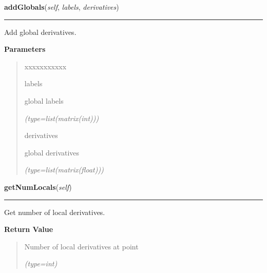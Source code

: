 \hspace{.8\funcindent}\begin{boxedminipage}{\funcwidth}

    \raggedright \textbf{addGlobals}(\textit{self}, \textit{labels}, \textit{derivatives})

    \vspace{-1.5ex}

    \rule{\textwidth}{0.5\fboxrule}
\setlength{\parskip}{2ex}
    Add global derivatives.

\setlength{\parskip}{1ex}
      \textbf{Parameters}
      \vspace{-1ex}

      \begin{quote}
        \begin{Ventry}{xxxxxxxxxxx}

          \item[labels]

          global labels

            {\it (type=list(matrix(int)))}

          \item[derivatives]

          global derivatives

            {\it (type=list(matrix(float)))}

        \end{Ventry}

      \end{quote}

    \end{boxedminipage}

    \label{gblfit:GblPoint:getNumLocals}

    \vspace{0.5ex}

\hspace{.8\funcindent}\begin{boxedminipage}{\funcwidth}

    \raggedright \textbf{getNumLocals}(\textit{self})

    \vspace{-1.5ex}

    \rule{\textwidth}{0.5\fboxrule}
\setlength{\parskip}{2ex}
    Get number of local derivatives.

\setlength{\parskip}{1ex}
      \textbf{Return Value}
    \vspace{-1ex}

      \begin{quote}
      Number of local derivatives at point

      {\it (type=int)}

      \end{quote}

    \end{boxedminipage}

